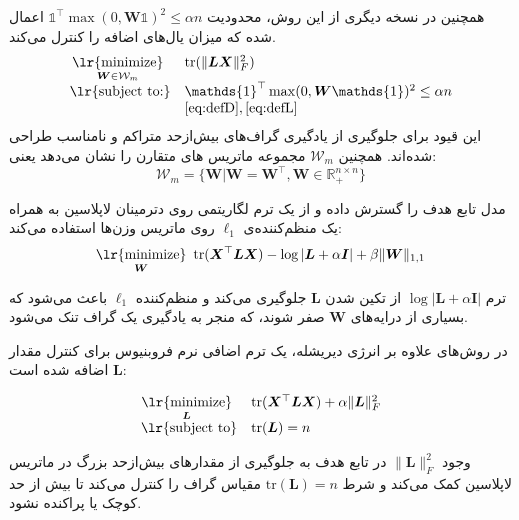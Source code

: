 \documentclass[10pt,twocolumn,a4paper]{article}
\newcommand\minimize[1]{\mathop{\text{\lr{minimize}}}\limits_{#1}\ }
\begin{document}
	همچنین در نسخه دیگری از این روش، محدودیت \( \mathds{1}^\top \max(0, \bm{W} \mathds{1})^2 \leq \alpha n \) اعمال شده که میزان یال‌های اضافه را کنترل می‌کند. 
	\begin{equation}
		\begin{array}{cl}
			\minimize{\bm{W}\in\mathcal{W}_m} & \text{tr}(\|\bm{L} \bm{X}\|^2_F) \\
			\text{\lr{subject to:}} & \mathds{1}^\top \max(0, \bm{W} \mathds{1})^2 \leq \alpha n  \\
			& \eqref{eq:defD}, \eqref{eq:defL}
		\end{array}
	\end{equation}
	این قیود برای جلوگیری از یادگیری گراف‌های بیش‌ازحد متراکم و نامناسب طراحی شده‌اند. همچنین 
	$\mathcal{W}_m$
	مجموعه ماتریس های متقارن را نشان می‌دهد یعنی:
	\begin{equation}
		\mathcal{W}_m = \big\{\bm{W} | \bm{W} = \bm{W}^\top, \bm{W} \in \mathds{R}_+^{n\times n}\big\}
	\end{equation}
	
	مدل \cite{Lake2010DiscoveringSB} تابع هدف را گسترش داده و از یک ترم لگاریتمی روی دترمینان لاپلاسین به همراه یک منظم‌کننده‌ی \( \ell_1 \) روی ماتریس وزن‌ها استفاده می‌کند:
	\begin{equation}
		\minimize{\bm{W}} \text{tr} (\bm{X}^\top \bm{L} \bm{X}) - \log | \bm{L} + \alpha \bm{I} | + \beta \| \bm{W} \|_{1,1}
	\end{equation}
	
	ترم \( \log | \bm{L} + \alpha \bm{I} | \) از تکین شدن \( \bm{L} \) جلوگیری می‌کند و منظم‌کننده \( \ell_1 \) باعث می‌شود که بسیاری از درایه‌های \( \bm{W} \) صفر شوند، که منجر به یادگیری یک گراف تنک می‌شود.
	
	در روش‌های
	\cite{Hu2015,Dong2016}
	علاوه بر انرژی دیریشله، یک ترم اضافی نرم فروبنیوس برای کنترل مقدار \( \bm{L} \) اضافه شده است:
	
	\begin{equation}
		\begin{array}{cl}
			\minimize{\bm{L}} & \text{tr} (\bm{X}^\top \bm{L} \bm{X}) + \alpha \|\bm{L}\|_F^2 \\
			\text{\lr{subject to}} & \text{tr}(\bm{L}) = n
		\end{array}
	\end{equation}
	
	وجود \( \|\bm{L}\|_F^2 \) در تابع هدف به جلوگیری از مقدارهای بیش‌ازحد بزرگ در ماتریس لاپلاسین کمک می‌کند و شرط \( \text{tr}(\bm{L}) = n \) مقیاس گراف را کنترل می‌کند تا بیش از حد کوچک یا پراکنده نشود.
	
\end{document}
